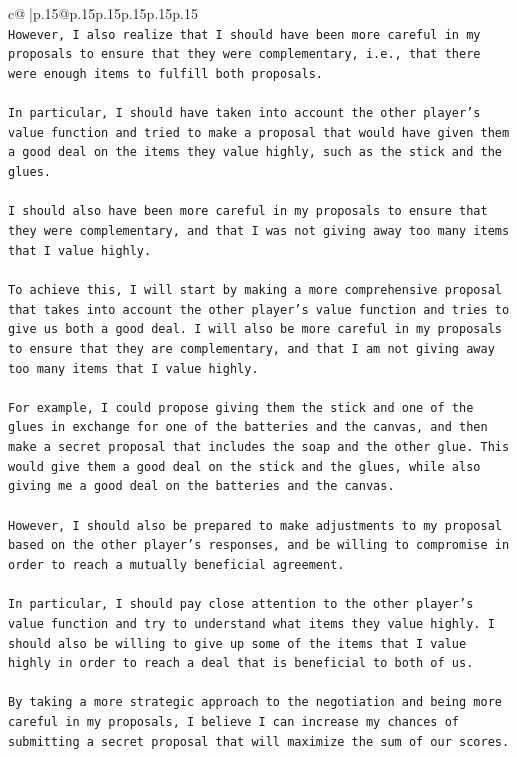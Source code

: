 \documentclass{article}
\begin{document}
{\begin{supertabular}{c@{$\;$}|p{.15\linewidth}@{}p{.15\linewidth}p{.15\linewidth}p{.15\linewidth}p{.15\linewidth}p{.15\linewidth}}
{{{\\ 
\texttt{However, I also realize that I should have been more careful in my proposals to ensure that they were complementary, i.e., that there were enough items to fulfill both proposals. } \\
\\ 
\texttt{In particular, I should have taken into account the other player's value function and tried to make a proposal that would have given them a good deal on the items they value highly, such as the stick and the glues. } \\
\\ 
\texttt{I should also have been more careful in my proposals to ensure that they were complementary, and that I was not giving away too many items that I value highly.} \\
\\ 
\texttt{To achieve this, I will start by making a more comprehensive proposal that takes into account the other player's value function and tries to give us both a good deal. I will also be more careful in my proposals to ensure that they are complementary, and that I am not giving away too many items that I value highly.} \\
\\ 
\texttt{For example, I could propose giving them the stick and one of the glues in exchange for one of the batteries and the canvas, and then make a secret proposal that includes the soap and the other glue. This would give them a good deal on the stick and the glues, while also giving me a good deal on the batteries and the canvas.} \\
\\ 
\texttt{However, I should also be prepared to make adjustments to my proposal based on the other player's responses, and be willing to compromise in order to reach a mutually beneficial agreement.} \\
\\ 
\texttt{In particular, I should pay close attention to the other player's value function and try to understand what items they value highly. I should also be willing to give up some of the items that I value highly in order to reach a deal that is beneficial to both of us.} \\
\\ 
\texttt{By taking a more strategic approach to the negotiation and being more careful in my proposals, I believe I can increase my chances of submitting a secret proposal that will maximize the sum of our scores.} \\
}}}
\end{supertabular}}
\end{document}

